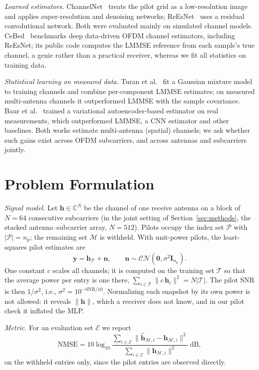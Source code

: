 \documentclass[conference]{IEEEtran}
\newcommand{\vh}{\bm{h}}
\newcommand{\hh}{\hat{\bm{h}}}
\newcommand{\vy}{\bm{y}}
\newcommand{\vn}{\bm{n}}
\newcommand{\mI}{\bm{I}}
\newcommand{\cP}{\mathcal{P}}
\newcommand{\cM}{\mathcal{M}}
\newcommand{\CN}{\mathcal{CN}}
\begin{document}
\emph{Learned estimators.} ChannelNet~\cite{soltani2019} treats the pilot grid as a low-resolution image
and applies super-resolution and denoising networks; ReEsNet~\cite{li2020} uses a residual convolutional
network. Both were evaluated mainly on simulated channel models. CeBed~\cite{feriani2023} benchmarks deep
data-driven OFDM channel estimators, including ReEsNet; its public code computes the LMMSE reference from
each sample's true channel, a genie rather than a practical receiver, whereas we fit all statistics on
training data.

\emph{Statistical learning on measured data.} Turan et al.~\cite{turan2022} fit a Gaussian mixture model
to training channels and combine per-component LMMSE estimates; on measured multi-antenna channels it
outperformed LMMSE with the sample covariance. Baur et al.~\cite{baur2024} trained a variational
autoencoder-based estimator on real measurements, which outperformed LMMSE, a CNN estimator and other
baselines. Both works estimate multi-antenna (spatial) channels; we ask whether such gains exist across
OFDM subcarriers, and across antennas and subcarriers jointly.

\section{Problem Formulation}
\label{sec:problem}
\emph{Signal model.} Let $\vh\in\mathbb{C}^N$ be the channel of one receive antenna on a block of $N=64$
consecutive subcarriers (in the joint setting of Section~\ref{sec:methods}, the stacked
antenna--subcarrier array, $N=512$). Pilots occupy the index set $\cP$ with $|\cP|=n_p$; the remaining set
$\cM$ is withheld. With unit-power pilots, the least-squares pilot estimates are
\begin{equation}
\vy=\vh_\cP+\vn,\qquad \vn\sim\CN(\bm{0},\sigma^2\mI_{n_p}).
\label{eq:model}
\end{equation}
One constant $c$ scales all channels; it is computed on the training set $\mathcal{T}$ so that the
average power per entry is one there, $\sum_{i\in\mathcal{T}}\|c\,\vh_i\|^2=N|\mathcal{T}|$. The pilot SNR
is then $1/\sigma^2$, i.e., $\sigma^2=10^{-\mathrm{SNR}/10}$. Normalizing each snapshot by its
own power is not allowed: it reveals $\|\vh\|$, which a receiver does not know, and in our pilot check it
inflated the MLP.

\emph{Metric.} For an evaluation set $\mathcal{E}$ we report
\begin{equation}
\mathrm{NMSE}=10\log_{10}\frac{\sum_{i\in\mathcal{E}}\|\hh_{\cM,i}-\vh_{\cM,i}\|^2}
{\sum_{i\in\mathcal{E}}\|\vh_{\cM,i}\|^2}\ \text{dB},
\label{eq:nmse}
\end{equation}
on the withheld entries only, since the pilot entries are observed directly.
\end{document}
